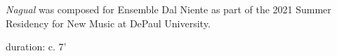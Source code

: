 \documentclass[11pt]{article}
\begin{document}
\vspace*{13\baselineskip}

\begin{center}
\textit{Nagual} was composed for Ensemble Dal Niente as part of the 2021 Summer Residency for New Music at DePaul University.
\rightskip\leftskip
\phantom{text} \hfill \phantom{()}
\end{center}

\vspace*{26\baselineskip}

\begin{center}
duration: c. 7'
\end{center}
\end{document}
